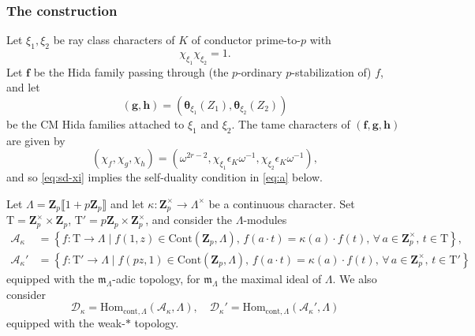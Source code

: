 \documentclass[10pt,letterpaper]{amsart}
\theoremstyle{plain}
\theoremstyle{definition}
\theoremstyle{definition}
\theoremstyle{plain}
\theoremstyle{plain}
\theoremstyle{plain}
\theoremstyle{remark}
\numberwithin{equation}{section}
\newcommand{\ch}{\xi}
\newcommand{\pp}{\mathfrak{p}}
\newcommand{\fkm}{\mathfrak{m}}
\newcommand{\fkf}{\mathfrak{f}}
\newcommand{\Z}{\mathbf{Z}}
\newcommand{\dBr}[1]{\llbracket{#1}\rrbracket}
\newcommand{\bff}{{\boldsymbol{f}}}
\newcommand{\bfg}{{\boldsymbol{g}}}
\newcommand{\bfh}{{\boldsymbol{h}}}
\begin{document}
\subsubsection{The construction}



Let $\xi_1,\xi_2$ be ray class characters of $K$ of conductor prime-to-$p$ with
\begin{equation}\label{eq:sd-xi}
\chi_{\xi_1}\chi_{\xi_2}=1.\tag{sd}
\end{equation}
Let $\bff$ be the Hida family passing through (the $p$-ordinary $p$-stabilization of) $f$, and let 
\[
(\bfg,\bfh)=(\boldsymbol{\theta}_{\ch_1}(Z_1), \boldsymbol{\theta}_{\xi_2}(Z_2))
\]
be the CM Hida families attached to $\xi_1$ and $\xi_2$. The tame characters of $(\bff,\bfg,\bfh)$ are given by 
\[
(\chi_f,\chi_g,\chi_h)=
(\omega^{2r-2},\chi_{\xi_1}\epsilon_K\omega^{-1},\chi_{\xi_2}\epsilon_K\omega^{-1}),
\]
and so \eqref{eq:sd-xi} implies the self-duality condition in \eqref{eq:a} below. 

Let $\Lambda=\Z_p\dBr{1+p\Z_p}$ and let $\kappa:\Z_p^\times\rightarrow\Lambda^\times$ be a continuous character. Set $\mathrm{T}=\Z_p^\times\times\Z_p$,  $\mathrm{T}'=p\Z_p\times\Z_p^\times$, %
and consider the $\Lambda$-modules
\begin{align*}
\mathcal{A}_{\kappa}&=\left\{ f:\mathrm{T}\rightarrow\Lambda\mid f(1,z)\in \text{Cont}(\Z_p,\Lambda),\, f(a\cdot t)=\kappa(a)\cdot f(t),\, \forall \,a\in\Z_p^\times,\, t\in \mathrm{T}\right\},\\
\mathcal{A}_{\kappa}'&=\left\{ f:\mathrm{T}'\rightarrow\Lambda\mid f(pz,1)\in \text{Cont}(\Z_p,\Lambda), \, f(a\cdot t)=\kappa(a)\cdot f(t) ,\, \forall \, a\in\Z_p^\times,\, t\in \mathrm{T}'\right\}
\end{align*}
equipped with the $\fkm_\Lambda$-adic topology, for $\fkm_\Lambda$ the maximal ideal of $\Lambda$. We also consider
\[
\mathcal{D}_{\kappa}=\mathrm{Hom}_{\text{cont},\Lambda}(\mathcal{A}_{\kappa},\Lambda),\quad\mathcal{D}_{\kappa}'=\mathrm{Hom}_{\text{cont},\Lambda}(\mathcal{A}_{\kappa}',\Lambda)
\]
equipped with the weak-$\ast$ topology. 
\end{document}
